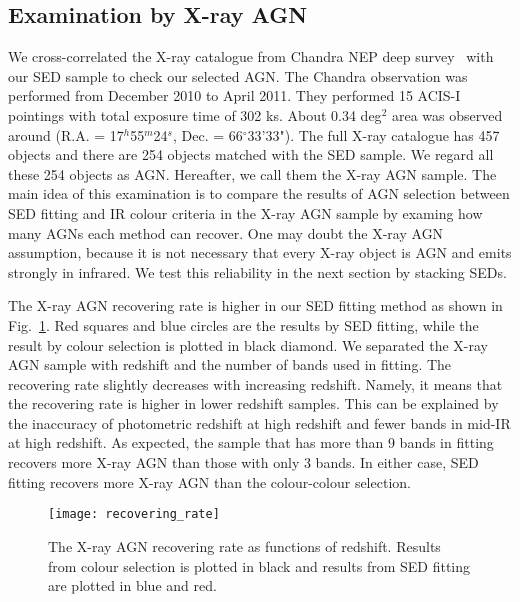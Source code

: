 \documentclass[a4paper,fleqn,usenatbib]{mnras}
\begin{document}
\subsection{Examination by X-ray AGN}
We cross-correlated the X-ray catalogue from Chandra NEP deep survey~\citep{Krumpe et al. 2015} with our SED sample to check our selected AGN. The Chandra observation was performed from December 2010 to April 2011. They performed 15 ACIS-I pointings with total exposure time of 302 ks. About 0.34 deg$^2$ area was observed around (R.A. = 17$^h$55$^m$24$^s$, Dec. = 66$^\circ$33'33"). The full X-ray catalogue has 457 objects and there are 254 objects matched with the SED sample. We regard all these 254 objects as AGN. Hereafter, we call them the X-ray AGN sample. The main idea of this examination is to compare the results of AGN selection between SED fitting and IR colour criteria in the X-ray AGN sample by examing how many AGNs each method can recover. One may doubt the X-ray AGN assumption, because it is not necessary that every X-ray object is AGN and emits strongly in infrared. We test this reliability in the next section by stacking SEDs.  

The X-ray AGN recovering rate is higher in our SED fitting method as shown in Fig.~\ref{fig:recovering_rate}. Red squares and blue circles are the results by SED fitting, while the result by colour selection is plotted in black diamond. We separated the X-ray AGN sample with redshift and the number of bands used in fitting. The recovering rate slightly decreases with increasing redshift. Namely, it means that the recovering rate is higher in lower redshift samples. This can be explained by the inaccuracy of photometric redshift at high redshift and fewer bands in mid-IR at high redshift. As expected, the sample that has more than 9 bands in fitting recovers more X-ray AGN than those with only 3 bands. In either case, SED fitting recovers more X-ray AGN than the colour-colour selection. 

\begin{figure}
	\texttt{[image: recovering\_rate]}
	    \caption{The X-ray AGN recovering rate as functions of redshift. Results from colour selection is plotted in black and results from SED fitting are plotted in blue and red.}
    \label{fig:recovering_rate}
\end{figure}
\end{document}
